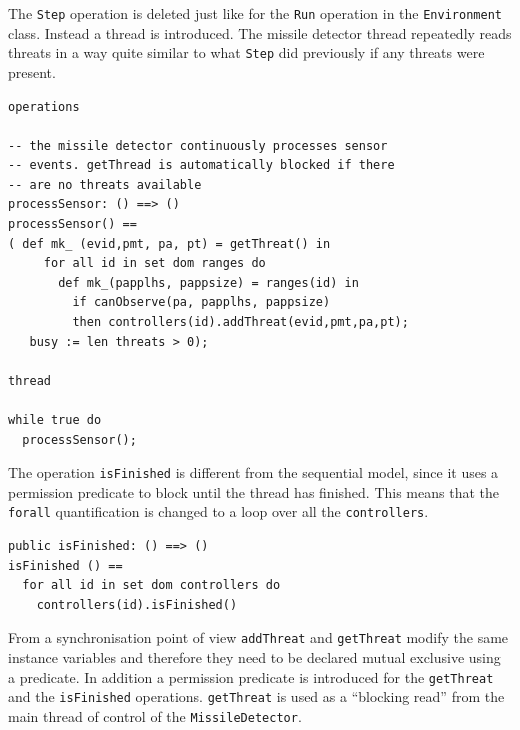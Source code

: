 \documentclass{overturerepchap}
\begin{document}
%

The \texttt{Step} operation is deleted just like for the \texttt{Run}
operation in the \texttt{Environment} class. Instead a thread is
introduced. The missile detector thread repeatedly reads threats 
in a way quite similar to what \texttt{Step} did previously if any threats
were present.

\begin{lstlisting} 
operations

-- the missile detector continuously processes sensor
-- events. getThread is automatically blocked if there
-- are no threats available
processSensor: () ==> ()
processSensor() ==
( def mk_ (evid,pmt, pa, pt) = getThreat() in
     for all id in set dom ranges do
       def mk_(papplhs, pappsize) = ranges(id) in
         if canObserve(pa, papplhs, pappsize)
         then controllers(id).addThreat(evid,pmt,pa,pt);
   busy := len threats > 0);

thread

while true do
  processSensor();
\end{lstlisting}

The operation \texttt{isFinished} is different from the sequential
model, since it uses a permission predicate to block until the thread
has finished. This means that the \texttt{forall} quantification is
changed to a loop over all the \texttt{controllers}.

\begin{lstlisting}
public isFinished: () ==> ()
isFinished () ==
  for all id in set dom controllers do
    controllers(id).isFinished()
\end{lstlisting}

From a synchronisation point of view \texttt{addThreat} and 
\texttt{getThreat} modify the same instance variables and
therefore they need to be declared mutual exclusive using a
{\bf{}} 
predicate. In addition a permission predicate is introduced for the
\texttt{getThreat} and the \texttt{isFinished} operations. 
\texttt{getThreat} is used as a ``blocking read'' from the main
thread of control of the \texttt{MissileDetector}.
\end{document}
